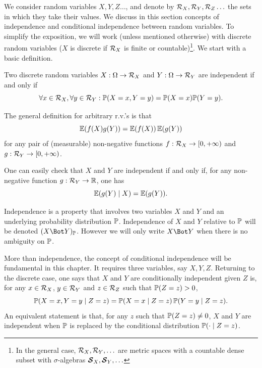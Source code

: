 We consider random variables $X, Y, Z\ldots $, and denote by ${\mathcal R}_X, {\mathcal R}_Y, {\mathcal R}_Z\ldots$ the sets in which they take their values.
We discuss in this section  concepts of independence and conditional independence between random variables. To simplify the exposition, we will work (unless mentioned otherwise) with discrete random variables ($X$ is discrete if ${\mathcal R}_X$ is finite or countable)\footnote{In the general case, ${\mathcal R}_X, {\mathcal R}_Y, \ldots$ are metric spaces with a countable dense subset with $\sigma$-algebras $\bm{{\mathcal S}}_X, \bm{{\mathcal S}}_Y, \ldots$}.   
We start with a basic definition.
\begin{definition}
\label{def:indep}

Two discrete random variables $X:\Omega \to {\mathcal R}_X$ and $Y:\Omega\to {\mathcal R}_Y$ are independent if and only if
$$
\forall x\in {\mathcal R}_X, \forall y\in {\mathcal R}_Y: \bm{\mathbb P}(X=x, Y=y) = \bm{\mathbb P}(X=x)\bm{\mathbb P}(Y=y).
$$
\end{definition}

The general definition for arbitrary r.v.'s is that 
\[
\bm{\mathbb E}(f(X)g(Y)) = \bm{\mathbb E}(f(X))\, \bm{\mathbb E}(g(Y))
\]
 for any pair of (measurable) non-negative functions $f:{\mathcal R}_X \to [0, +\infty)$ and $g:{\mathcal R}_Y\to [0, +\infty)$.



One can easily check that $X$ and $Y$ are independent
if and only if, for any non-negative function $g: {\mathcal R}_Y \to {\mathbb{R}}$, one
has
$$
\bm{\mathbb E}(g(Y)\mid X) = \bm{\mathbb E}(g(Y)).
$$

 

\begin{notation}
\label{not:ind}
Independence is a
property that involves two variables $X$ and $Y$ and an underlying
probability distribution $\bm{\mathbb P}$. Independence of $X$ and $Y$ relative to
$\bm{\mathbb P}$ will be denoted $(X\indp Y)_{\myP}$. However we will only write
$X\indp Y$ when there is no ambiguity on $\bm{\mathbb P}$.  
\end{notation}


More than independence, the concept of conditional independence will
be fundamental in this chapter. It requires three variables, say
$X,Y,Z$. Returning to the discrete case, one says  that $X$ and $Y$ are conditionally independent
given $Z$ is, for any $x\in {\mathcal R}_X$, $y\in {\mathcal R}_Y$ and $z\in {\mathcal R}_Z$ such that $\bm{\mathbb P}(Z=z) > 0$,
\begin{equation}
\label{eq:cond.ind.discrete}
\bm{\mathbb P}(X=x, Y=y\mid Z=z) = \bm{\mathbb P}(X=x\mid Z=z)\, \bm{\mathbb P}(Y=y\mid Z=z).
\end{equation}
An equivalent statement is that, for any $z$ such that $\bm{\mathbb P}(Z=z) \neq 0$,  $X$ and $Y$ are independent when $\bm{\mathbb P}$
is replaced by the conditional distribution $\bm{\mathbb P}(\cdot\mid Z=z)$.

